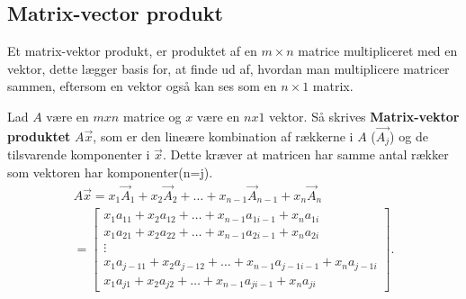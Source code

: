 \subsection{Matrix-vector produkt}
Et matrix-vektor produkt, er produktet af en $m\times n$ matrice multipliceret med en vektor, dette lægger basis for, at finde ud af, hvordan man multiplicere matricer sammen, eftersom en vektor også kan ses som en $n\times1$ matrix. 
\begin{defn}
Lad $A$ være en $mxn$ matrice og $x$ være en $nx1$ vektor. Så skrives \textbf{Matrix-vektor produktet} $A\vec{x}$, som er den lineære kombination af rækkerne i $A$ ($\vec{A_j}$) og de tilsvarende komponenter i $\vec{x}$. Dette kræver at matricen har samme antal rækker som vektoren har komponenter(n=j).
\begin{align*}
A\vec{x}=x_1\vec{A}_1+x_2\vec{A}_2+ \dots +x_{n-1}\vec{A}_{n-1}+x_n\vec{A}_n \\
=
\begin{bmatrix}
x_1a_{1 1}+x_2a_{1 2}+\dots +x_{n-1}a_{1 i-1}+x_na_{1 i} \\
x_1a_{2 1}+x_2a_{2 2}+\dots +x_{n-1}a_{2 i-1}+x_na_{2 i}\\
\vdots\\
x_1a_{j-1 1}+x_2a_{j-1 2}+\dots +x_{n-1}a_{j-1 i-1}+x_na_{j-1 i} \\
x_1a_{j 1}+x_2a_{j 2}+\dots +x_{n-1}a_{j i-1}+x_na_{j i}
\end{bmatrix}.
\end{align*}
\end{defn}
